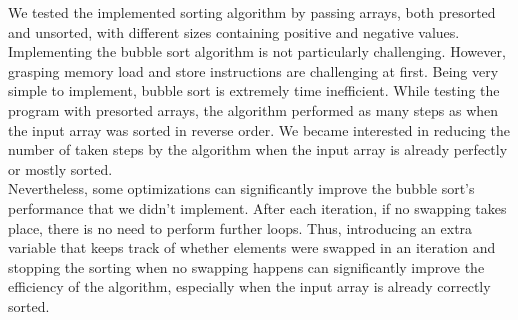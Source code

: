 \documentclass[10pt]{article}
\begin{document}
We tested the implemented sorting algorithm by passing arrays, both presorted and unsorted, with different sizes containing positive and negative values.
Implementing the bubble sort algorithm is not particularly challenging. However, grasping memory load and store instructions are challenging at first. Being very simple to implement, bubble sort is extremely time inefficient. While testing the program with presorted arrays, the algorithm performed as many steps as when the input array was sorted in reverse order. We became interested in reducing the number of taken steps by the algorithm when the input array is already perfectly or mostly sorted. \\

Nevertheless, some optimizations can significantly improve the bubble sort's performance that we didn't implement. After each iteration, if no swapping takes place, there is no need to perform further loops. Thus, introducing an extra variable that keeps track of whether elements were swapped in an iteration and stopping the sorting when no swapping happens can significantly improve the efficiency of the algorithm, especially when the input array is already correctly sorted.
\end{document}
